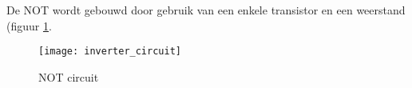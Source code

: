 De NOT wordt gebouwd door gebruik van een enkele transistor en een weerstand (figuur \ref{circuit:not}.

\begin{figure}[h]
\texttt{[image: inverter\_circuit]}
\centering
\caption{NOT circuit}
\label{circuit:not}
\end{figure}

